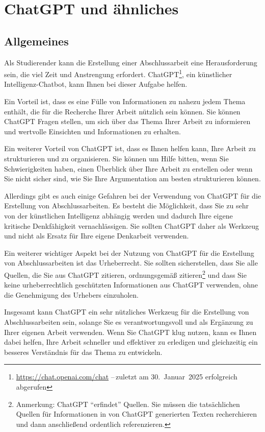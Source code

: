 \chapter{ChatGPT und ähnliches}\label{apdx:ChatGPT}
\section{Allgemeines}\label{apdx:sect:General}
Als Studierender kann die Erstellung einer Abschlussarbeit eine Herausforderung sein, die viel Zeit und Anstrengung erfordert. ChatGPT\footnote{\url{https://chat.openai.com/chat} --\,zuletzt am 30.~Januar~2025 erfolgreich abgerufen}, ein künstlicher Intelligenz-Chatbot, kann Ihnen bei dieser Aufgabe helfen.

Ein Vorteil ist, dass es eine Fülle von Informationen zu nahezu jedem Thema enthält, die für die Recherche Ihrer Arbeit nützlich sein können. Sie können ChatGPT Fragen stellen, um sich über das Thema Ihrer Arbeit zu informieren und wertvolle Einsichten und Informationen zu erhalten.

Ein weiterer Vorteil von ChatGPT ist, dass es Ihnen helfen kann, Ihre Arbeit zu strukturieren und zu organisieren. Sie können um Hilfe bitten, wenn Sie Schwierigkeiten haben, einen Überblick über Ihre Arbeit zu erstellen oder wenn Sie nicht sicher sind, wie Sie Ihre Argumentation am besten strukturieren können.

Allerdings gibt es auch einige Gefahren bei der Verwendung von ChatGPT für die Erstellung von Abschlussarbeiten. Es besteht die Möglichkeit, dass Sie zu sehr von der künstlichen Intelligenz abhängig werden und dadurch Ihre eigene kritische Denkfähigkeit vernachlässigen. Sie sollten ChatGPT daher als Werkzeug und nicht als Ersatz für Ihre eigene Denkarbeit verwenden.

Ein weiterer wichtiger Aspekt bei der Nutzung von ChatGPT für die Erstellung von Abschlussarbeiten ist das Urheberrecht. Sie sollten sicherstellen, dass Sie alle Quellen, die Sie aus ChatGPT zitieren, ordnungsgemäß zitieren\footnote{Anmerkung: ChatGPT \enquote{erfindet} Quellen. Sie müssen die tatsächlichen Quellen für Informationen in von ChatGPT generierten Texten recherchieren und dann anschließend ordentlich referenzieren.} und dass Sie keine urheberrechtlich geschützten Informationen aus ChatGPT verwenden, ohne die Genehmigung des Urhebers einzuholen.

Insgesamt kann ChatGPT ein sehr nützliches Werkzeug für die Erstellung von Abschlussarbeiten sein, solange Sie es verantwortungsvoll und als Ergänzung zu Ihrer eigenen Arbeit verwenden. Wenn Sie ChatGPT klug nutzen, kann es Ihnen dabei helfen, Ihre Arbeit schneller und effektiver zu erledigen und gleichzeitig ein besseres Verständnis für das Thema zu entwickeln.

